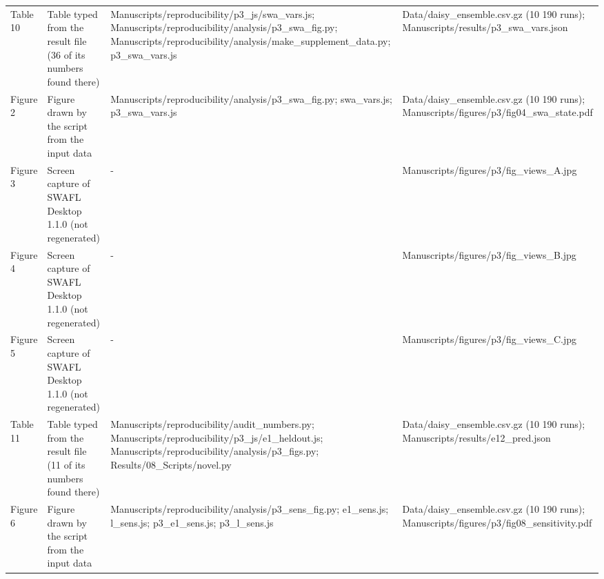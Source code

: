 {\begin{longtable}{p{}p{}p{}p{}}
{}Table 10 & Table typed from the result file (36 of its numbers found there) & Manuscripts/\allowbreak{}reproducibility/\allowbreak{}p3\_\allowbreak{}js/\allowbreak{}swa\_\allowbreak{}vars.js;  Manuscripts/\allowbreak{}reproducibility/\allowbreak{}analysis/\allowbreak{}p3\_\allowbreak{}swa\_\allowbreak{}fig.py;  Manuscripts/\allowbreak{}reproducibility/\allowbreak{}analysis/\allowbreak{}make\_\allowbreak{}supplement\_\allowbreak{}data.py;  p3\_\allowbreak{}swa\_\allowbreak{}vars.js & Data/\allowbreak{}daisy\_\allowbreak{}ensemble.csv.gz (10 190 runs);  Manuscripts/\allowbreak{}results/\allowbreak{}p3\_\allowbreak{}swa\_\allowbreak{}vars.json\\
{}Figure 2 & Figure drawn by the script from the input data & Manuscripts/\allowbreak{}reproducibility/\allowbreak{}analysis/\allowbreak{}p3\_\allowbreak{}swa\_\allowbreak{}fig.py;  swa\_\allowbreak{}vars.js;  p3\_\allowbreak{}swa\_\allowbreak{}vars.js & Data/\allowbreak{}daisy\_\allowbreak{}ensemble.csv.gz (10 190 runs);  Manuscripts/\allowbreak{}figures/\allowbreak{}p3/\allowbreak{}fig04\_\allowbreak{}swa\_\allowbreak{}state.pdf\\
{}Figure 3 & Screen capture of SWAFL Desktop 1.1.0 (not regenerated) & - & Manuscripts/\allowbreak{}figures/\allowbreak{}p3/\allowbreak{}fig\_\allowbreak{}views\_\allowbreak{}A.jpg\\
{}Figure 4 & Screen capture of SWAFL Desktop 1.1.0 (not regenerated) & - & Manuscripts/\allowbreak{}figures/\allowbreak{}p3/\allowbreak{}fig\_\allowbreak{}views\_\allowbreak{}B.jpg\\
{}Figure 5 & Screen capture of SWAFL Desktop 1.1.0 (not regenerated) & - & Manuscripts/\allowbreak{}figures/\allowbreak{}p3/\allowbreak{}fig\_\allowbreak{}views\_\allowbreak{}C.jpg\\
{}Table 11 & Table typed from the result file (11 of its numbers found there) & Manuscripts/\allowbreak{}reproducibility/\allowbreak{}audit\_\allowbreak{}numbers.py;  Manuscripts/\allowbreak{}reproducibility/\allowbreak{}p3\_\allowbreak{}js/\allowbreak{}e1\_\allowbreak{}heldout.js;  Manuscripts/\allowbreak{}reproducibility/\allowbreak{}analysis/\allowbreak{}p3\_\allowbreak{}figs.py;  Results/\allowbreak{}08\_\allowbreak{}Scripts/\allowbreak{}novel.py & Data/\allowbreak{}daisy\_\allowbreak{}ensemble.csv.gz (10 190 runs);  Manuscripts/\allowbreak{}results/\allowbreak{}e12\_\allowbreak{}pred.json\\
{}Figure 6 & Figure drawn by the script from the input data & Manuscripts/\allowbreak{}reproducibility/\allowbreak{}analysis/\allowbreak{}p3\_\allowbreak{}sens\_\allowbreak{}fig.py;  e1\_\allowbreak{}sens.js;  l\_\allowbreak{}sens.js;  p3\_\allowbreak{}e1\_\allowbreak{}sens.js;  p3\_\allowbreak{}l\_\allowbreak{}sens.js & Data/\allowbreak{}daisy\_\allowbreak{}ensemble.csv.gz (10 190 runs);  Manuscripts/\allowbreak{}figures/\allowbreak{}p3/\allowbreak{}fig08\_\allowbreak{}sensitivity.pdf\\

\end{longtable}}
